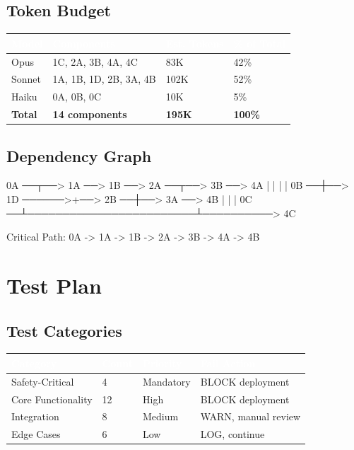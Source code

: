 \documentclass[11pt,letterpaper]{article}
\newcommand{\tableheader}[1]{\textbf{\sffamily\textcolor{white}{#1}}}
\begin{document}
\subsection{Token Budget}

\begin{center}
\begin{tabularx}{\textwidth}{L{3cm}C{2cm}C{2cm}C{2cm}}
\toprule
{}
\tableheader{Model} & \tableheader{Components} & \tableheader{Est. Tokens} & \tableheader{\% of Total} \\
\midrule
Opus & 1C, 2A, 3B, 4A, 4C & 83K & 42\% \\
Sonnet & 1A, 1B, 1D, 2B, 3A, 4B & 102K & 52\% \\
Haiku & 0A, 0B, 0C & 10K & 5\% \\
\midrule
\textbf{Total} & \textbf{14 components} & \textbf{195K} & \textbf{100\%} \\
\bottomrule
\end{tabularx}
\end{center}

\subsection{Dependency Graph}

\begin{asciibox}
0A ──┬──> 1A ──> 1B ──> 2A ──┬──> 3B ──> 4A
     |              |         |              |
0B ──┼──> 1D ──────>+──> 2B ──┼──> 3A ──> 4B
     |                        |              |
0C ──┴────────────────────────┴──────────> 4C

Critical Path: 0A -> 1A -> 1B -> 2A -> 3B -> 4A -> 4B
\end{asciibox}

\section{Test Plan}

\subsection{Test Categories}

\begin{center}
\begin{tabularx}{\textwidth}{L{3cm}C{1.5cm}C{2cm}C{2.5cm}}
\toprule
{}
\tableheader{Category} & \tableheader{Count} & \tableheader{Priority} & \tableheader{Fail Action} \\
\midrule
Safety-Critical & 4 & Mandatory & BLOCK deployment \\
Core Functionality & 12 & High & BLOCK deployment \\
Integration & 8 & Medium & WARN, manual review \\
Edge Cases & 6 & Low & LOG, continue \\
\bottomrule
\end{tabularx}
\end{center}
\end{document}

